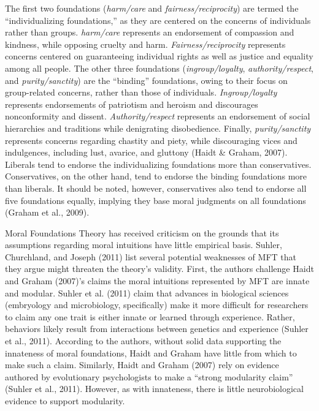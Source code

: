 \documentclass[english,,man]{apa6}
\begin{document}
The first two foundations (\emph{harm/care} and \emph{fairness/reciprocity}) are termed the \enquote{individualizing foundations,} as they are centered on the concerns of individuals rather than groups. \emph{harm/care} represents an endorsement of compassion and kindness, while opposing cruelty and harm. \emph{Fairness/reciprocity} represents concerns centered on guaranteeing individual rights as well as justice and equality among all people. The other three foundations (\emph{ingroup/loyalty}, \emph{authority/respect}, and \emph{purity/sanctity}) are the \enquote{binding} foundations, owing to their focus on group-related concerns, rather than those of individuals. \emph{Ingroup/loyalty} represents endorsements of patriotism and heroism and discourages nonconformity and dissent. \emph{Authority/respect} represents an endorsement of social hierarchies and traditions while denigrating disobedience. Finally, \emph{purity/sanctity} represents concerns regarding chastity and piety, while discouraging vices and indulgences, including lust, avarice, and gluttony (Haidt \& Graham, 2007). Liberals tend to endorse the individualizing foundations more than conservatives. Conservatives, on the other hand, tend to endorse the binding foundations more than liberals. It should be noted, however, conservatives also tend to endorse all five foundations equally, implying they base moral judgments on all foundations (Graham et al., 2009).

Moral Foundations Theory has received criticism on the grounds that its assumptions regarding moral intuitions have little empirical basis. Suhler, Churchland, and Joseph (2011) list several potential weaknesses of MFT that they argue might threaten the theory's validity. First, the authors challenge Haidt and Graham (2007)'s claims the moral intuitions represented by MFT are innate and modular. Suhler et al. (2011) claim that advances in biological sciences (embryology and microbiology, specifically) make it more difficult for researchers to claim any one trait is either innate or learned through experience. Rather, behaviors likely result from interactions between genetics and experience (Suhler et al., 2011). According to the authors, without solid data supporting the innateness of moral foundations, Haidt and Graham have little from which to make such a claim. Similarly, Haidt and Graham (2007) rely on evidence authored by evolutionary psychologists to make a \enquote{strong modularity claim} (Suhler et al., 2011). However, as with innateness, there is little neurobiological evidence to support modularity.
\end{document}
